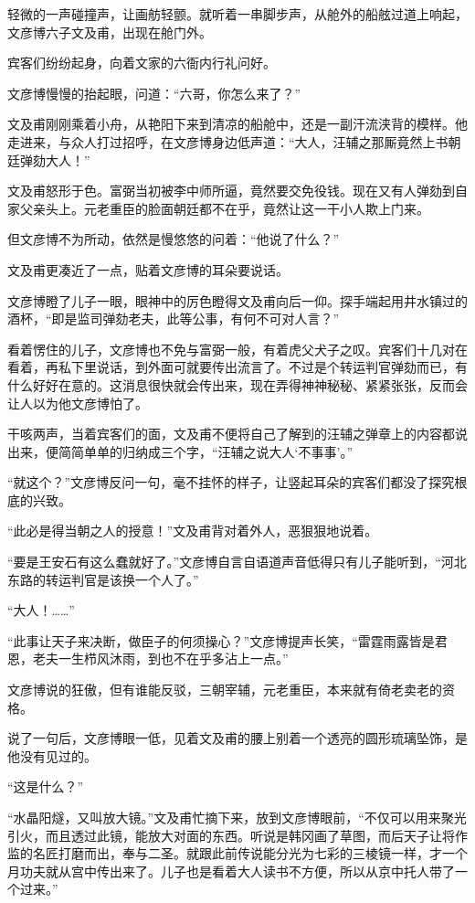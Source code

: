轻微的一声碰撞声，让画舫轻颤。就听着一串脚步声，从舱外的船舷过道上响起，文彦博六子文及甫，出现在舱门外。

宾客们纷纷起身，向着文家的六衙内行礼问好。

文彦博慢慢的抬起眼，问道：“六哥，你怎么来了？”

文及甫刚刚乘着小舟，从艳阳下来到清凉的船舱中，还是一副汗流浃背的模样。他走进来，与众人打过招呼，在文彦博身边低声道：“大人，汪辅之那厮竟然上书朝廷弹劾大人！”

文及甫怒形于色。富弼当初被李中师所逼，竟然要交免役钱。现在又有人弹劾到自家父亲头上。元老重臣的脸面朝廷都不在乎，竟然让这一干小人欺上门来。

但文彦博不为所动，依然是慢悠悠的问着：“他说了什么？”

文及甫更凑近了一点，贴着文彦博的耳朵要说话。

文彦博瞪了儿子一眼，眼神中的厉色瞪得文及甫向后一仰。探手端起用井水镇过的酒杯，“即是监司弹劾老夫，此等公事，有何不可对人言？”

看着愣住的儿子，文彦博也不免与富弼一般，有着虎父犬子之叹。宾客们十几对在看着，再私下里说话，到外面可就要传出流言了。不过是个转运判官弹劾而已，有什么好好在意的。这消息很快就会传出来，现在弄得神神秘秘、紧紧张张，反而会让人以为他文彦博怕了。

干咳两声，当着宾客们的面，文及甫不便将自己了解到的汪辅之弹章上的内容都说出来，便简简单单的归纳成三个字，“汪辅之说大人‘不事事’。”

“就这个？”文彦博反问一句，毫不挂怀的样子，让竖起耳朵的宾客们都没了探究根底的兴致。

“此必是得当朝之人的授意！”文及甫背对着外人，恶狠狠地说着。

“要是王安石有这么蠢就好了。”文彦博自言自语道声音低得只有儿子能听到，“河北东路的转运判官是该换一个人了。”

“大人！……”

“此事让天子来决断，做臣子的何须操心？”文彦博提声长笑，“雷霆雨露皆是君恩，老夫一生栉风沐雨，到也不在乎多沾上一点。”

文彦博说的狂傲，但有谁能反驳，三朝宰辅，元老重臣，本来就有倚老卖老的资格。

说了一句后，文彦博眼一低，见着文及甫的腰上别着一个透亮的圆形琉璃坠饰，是他没有见过的。

“这是什么？”

“水晶阳燧，又叫放大镜。”文及甫忙摘下来，放到文彦博眼前，“不仅可以用来聚光引火，而且透过此镜，能放大对面的东西。听说是韩冈画了草图，而后天子让将作监的名匠打磨而出，奉与二圣。就跟此前传说能分光为七彩的三棱镜一样，才一个月功夫就从宫中传出来了。儿子也是看着大人读书不方便，所以从京中托人带了一个过来。”


